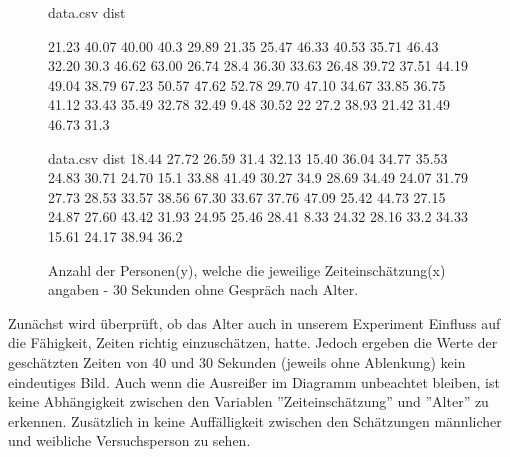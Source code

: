 \documentclass{Paper}
\begin{document}
\begin{figure}[H]
\begin{filecontents}{data.csv}
dist

21.23
40.07
40.00
40.3
29.89
21.35
25.47
 46.33
  40.53
 35.71
 46.43
32.20
 30.3
 46.62
 63.00
 26.74
 28.4
 36.30
 33.63
 26.48
 39.72
37.51
 44.19
 49.04
38.79
 67.23
 50.57
47.62
52.78
 29.70
 47.10
 34.67
33.85
36.75
 41.12
 33.43
 35.49
 32.78
 32.49
 9.48
 30.52
 22
  27.2
 38.93
 21.42
 31.49
46.73
 31.3
\end{filecontents}
\begin{minipage}[t]{0.49\linewidth}
\caption{Anzahl der Personen(y), welche die jeweilige Zeiteinschätzung(x) angaben - 40 Sekunden ohne Gespräch nach Alter.}
\label{HistZeit40sek}
\end{minipage}
\hfill
\begin{filecontents}{data.csv}
dist
 18.44
 27.72
 26.59
 31.4
 32.13
 15.40
 36.04
 34.77
 35.53
 24.83
 30.71
 24.70
 15.1
 33.88
 41.49
 30.27
 34.9
 28.69
 34.49
 24.07
 31.79
 27.73
 28.53
 33.57
 38.56
 67.30
 33.67
 37.76
 47.09
25.42
44.73
 27.15
 24.87
 27.60
 43.42
 31.93
 24.95
 25.46
 28.41
 8.33
 24.32
 28.16
 33.2
 34.33
 15.61
 24.17
38.94
 36.2
\end{filecontents}
\begin{minipage}[t]{0.49\linewidth}
\caption{Anzahl der Personen(y), welche die jeweilige Zeiteinschätzung(x) angaben - 30 Sekunden ohne Gespräch nach Alter.}
\label{HistZeit30sek}
\end{minipage}
\end{figure}


Zunächst wird überprüft, ob das Alter auch in unserem Experiment Einfluss auf die Fähigkeit, Zeiten richtig einzuschätzen, hatte. Jedoch ergeben die Werte der geschätzten Zeiten von 40 und 30 Sekunden (jeweils ohne Ablenkung) kein eindeutiges Bild. Auch wenn die Ausreißer im Diagramm unbeachtet bleiben, ist keine Abhängigkeit zwischen den Variablen ''Zeiteinschätzung'' und ''Alter'' zu erkennen. Zusätzlich in keine Auffälligkeit zwischen den Schätzungen männlicher und weibliche Versuchsperson zu sehen.
\end{document}
